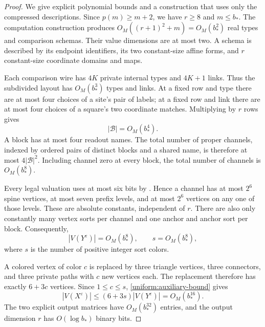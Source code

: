 \documentclass[11pt]{article}
\theoremstyle{definition}
\begin{document}
\begin{proof}
We give explicit polynomial bounds and a construction that uses only the
compressed descriptions.  Since $p(m)\geq m+2$, we have $r\geq 8$ and
$m\leq b_*$.  The computation construction produces
$O_M((r+1)^2+m)=O_M(b_*^2)$ real types and comparison schemas.  Their
value dimensions are at most two.  A schema is described by its endpoint
identifiers, its two constant-size affine forms, and $r$ constant-size
coordinate domains and maps.

Each comparison wire has $4K$ private internal types and $4K+1$ links.
Thus the subdivided layout has $O_M(b_*^3)$ types and links.  At a fixed
row and type there are at most four choices of a site's pair of labels;
at a fixed row and link there are at most four choices of a square's two
coordinate matches.  Multiplying by $r$ rows gives
\begin{equation}
\label{uniform:block-bound}
 \left\lvert{\mathcal B}\right\rvert=O_M(b_*^4).
\end{equation}
A block has at most four readout names.  The total number of proper
channels, indexed by ordered pairs of distinct blocks and a shared name,
is therefore at most $4\left\lvert{\mathcal B}\right\rvert^2$.  Including channel zero at every
block, the total number of channels is $O_M(b_*^8)$.

Every legal valuation uses at most six bits by
.  Hence a channel has at most $2^6$ spine
vertices, at most seven prefix levels, and at most $2^6$ vertices on any
one of those levels.  These are absolute constants, independent of $r$.
There are also only constantly many vertex sorts per channel and one
anchor and anchor sort per block.  Consequently,
\begin{equation}
\label{uniform:auxiliary-bound}
 \left\lvert{V(Y^\varepsilon)}\right\rvert=O_M(b_*^8),\qquad
 s=O_M(b_*^8),
\end{equation}
where $s$ is the number of positive integer sort colors.

A colored vertex of color $c$ is replaced by three triangle vertices,
three connectors, and three private paths with $c$ new vertices each.
The replacement therefore has exactly $6+3c$ vertices.  Since
$1\leq c\leq s$, \eqref{uniform:auxiliary-bound} gives
\begin{equation}
\label{uniform:graph-bound}
 \left\lvert{V(X^\varepsilon)}\right\rvert
 \leq (6+3s)\left\lvert{V(Y^\varepsilon)}\right\rvert=O_M(b_*^{16}).
\end{equation}
The two explicit output matrices have $O_M(b_*^{32})$ entries, and the
output dimension $r$ has $O(\log b_*)$ binary bits.


\end{proof}
\end{document}
